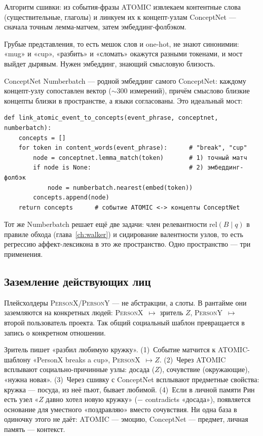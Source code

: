 Алгоритм сшивки: из события-фразы ATOMIC извлекаем контентные слова
(существительные, глаголы) и линкуем их к концепт-узлам ConceptNet — сначала точным
лемма-матчем, затем эмбеддинг-фолбэком.

\begin{pitfall}
Грубые представления, то есть мешок слов и one-hot, не знают синонимии: «mug» и
«cup», «разбить» и «сломать» окажутся разными токенами, и мост выйдет дырявым.
Нужен эмбеддинг, знающий смысловую близость.
\end{pitfall}

ConceptNet Numberbatch — родной эмбеддинг самого ConceptNet: каждому концепт-узлу
сопоставлен вектор ($\sim$300 измерений), причём смыслово близкие концепты близки в
пространстве, а языки согласованы. Это идеальный мост:

\begin{lstlisting}[style=pseudo]
def link_atomic_event_to_concepts(event_phrase, conceptnet, numberbatch):
    concepts = []
    for token in content_words(event_phrase):      # "break", "cup"
        node = conceptnet.lemma_match(token)       # 1) точный матч
        if node is None:                           # 2) эмбеддинг-фолбэк
            node = numberbatch.nearest(embed(token))
        concepts.append(node)
    return concepts      # событие ATOMIC <-> концепты ConceptNet
\end{lstlisting}

Тот же Numberbatch решает ещё две задачи: член релевантности $\text{rel}(B\mid q)$ в
правиле обхода (глава~\ref{ch:walker}) и сидирование валентности узлов, то есть
регрессию аффект-лексикона в это же пространство. Одно пространство — три применения.

\subsection{Заземление действующих лиц}

Плейсхолдеры \textsc{PersonX}/\textsc{PersonY} — не абстракции, а слоты. В рантайме
они заземляются на конкретных людей: \textsc{PersonX}~$\mapsto$ зритель $Z$,
\textsc{PersonY}~$\mapsto$ второй пользователь проекта. Так общий социальный шаблон
превращается в запись о конкретном отношении.

\begin{workedbox}
Зритель пишет «разбил любимую кружку». (1)~Событие матчится к ATOMIC-шаблону
«PersonX breaks a cup», \textsc{PersonX}~$\mapsto Z$. (2)~Через ATOMIC всплывают
социально-причинные узлы: досада ($Z$), сочувствие (окружающие), «нужна новая».
(3)~Через сшивку с ConceptNet всплывают предметные свойства: кружка — посуда, из неё
пьют, бывает любимой. (4)~Если в личной памяти Рин есть узел «$Z$ давно хотел новую
кружку» ($-$ contradicts «досада»), появляется основание для уместного «поздравляю»
вместо сочувствия. Ни одна база в одиночку этого не даёт: ATOMIC — эмоцию,
ConceptNet — предмет, личная память — контекст.
\end{workedbox}

